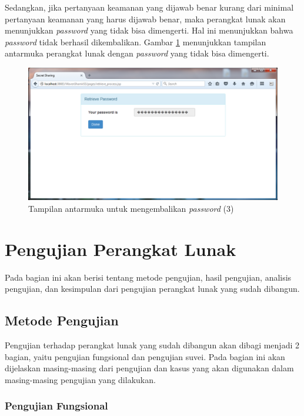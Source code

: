 Sedangkan, jika pertanyaan keamanan yang dijawab benar kurang dari minimal pertanyaan keamanan yang harus dijawab benar, maka perangkat lunak akan menunjukkan \textit{password} yang tidak bisa dimengerti. Hal ini menunjukkan bahwa \textit{password} tidak berhasil dikembalikan. Gambar \ref{fig:tampilan4_1} menunjukkan tampilan antarmuka perangkat lunak dengan \textit{password} yang tidak bisa dimengerti.

\begin{figure}[H]
	\includegraphics[scale=0.5]{Gambar/tampilan4_1}
	\centering
	\caption{Tampilan antarmuka untuk mengembalikan \textit{password} (3)}\label{fig:tampilan4_1}
\end{figure}

\section{Pengujian Perangkat Lunak}

Pada bagian ini akan berisi tentang metode pengujian, hasil pengujian, analisis pengujian, dan kesimpulan dari pengujian perangkat lunak yang sudah dibangun.

\subsection{Metode Pengujian}

Pengujian terhadap perangkat lunak yang sudah dibangun akan dibagi menjadi 2 bagian, yaitu pengujian fungsional dan pengujian suvei. Pada bagian ini akan dijelaskan masing-masing dari pengujian dan kasus yang akan digunakan dalam masing-masing pengujian yang dilakukan.

\subsubsection{Pengujian Fungsional}
	
